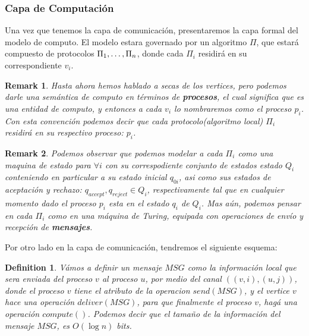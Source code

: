 \documentclass[10pt]{report}
\newtheorem*{remark}{Remark}
\newtheorem{definition}{Definition}
\begin{document}
{    %
    \subsubsection{Capa de Computación}
    Una vez que tenemos la capa de comunicación, presentaremos la capa formal del modelo de
    computo.\newline
    El modelo estara governado por un algoritmo $\Pi$, que estará compuesto de protocolos
    $\Pi_{1},\mathellipsis,\Pi_{n}$, donde cada $\Pi_{i}$ residirá en su correspondiente $v_{i}$.
    \newline
    \begin{remark}
        Hasta ahora hemos hablado a secas de los vertices, pero podemos darle una semántica
        de computo en términos de \textbf{procesos}, el cual significa que es una entidad de computo, y entonces a cada $v_{i}$
        lo nombraremos como el proceso $p_{i}$.\newline
        Con esta convención podemos decir que cada protocolo(algoritmo local) $\Pi_{i}$ residirá en su respectivo proceso:
        $p_{i}$.

    \end{remark}
    \begin{remark}
        Podemos observar que podemos modelar a cada $\Pi_{i}$ como una maquina de estado para $\forall i$ con su
        correspodiente conjunto de estados estado $Q_{i}$ conteniendo en particular a su estado inicial  $q_{0i}$, asi como sus estados de
        aceptación y rechazo: $q_{accept},q_{reject}\in Q_{i}$, respectivamente tal que en cualquier
        momento dado el proceso $p_{i}$ esta en el estado $q_{i}$ de $Q_{i}$.
        \space
        Mas aún, podemos pensar en cada $\Pi_{i}$ como en una máquina de Turing, equipada con operaciones de envío y
        recepción de \textbf{mensajes}.
    \end{remark}
    \newline
    Por otro lado en la capa de comunicación, tendremos el siguiente esquema:
    \newline
    \begin{definition}
        Vámos a definir un mensaje $MSG$ como la información local que sera enviada del proceso $v$ al proceso $u$,
        por medio del canal $((v,i),(u,j))$, donde el proceso $v$ tiene el atributo de la operacion $send(MSG)$, y el vertice
        $v$ hace una operación $deliver(MSG)$, para que finalmente el proceso $v$, hagá una operación $compute()$.
        \newline
        Podemos decir que el tamaño de la información del mensaje $MSG$, es $O(\log n)$ bits.
    \end{definition}

}
\end{document}
